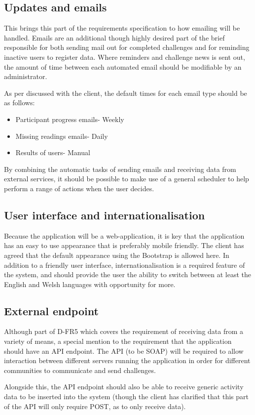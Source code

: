 \subsection{Updates and emails}
This brings this part of the requirements specification to how emailing will be handled. Emails are an additional though highly desired part of the brief responsible for both sending mail out for completed challenges and for reminding inactive users to register data. Where reminders and challenge news is sent out, the amount of time between each automated email should be modifiable by an administrator. \par
As per discussed with the client, the default times for each email type should be as follows:
\begin{itemize}
\item Participant progress emails- Weekly
\item Missing readings emails- Daily
\item Results of users- Manual
\end{itemize}
By combining the automatic tasks of sending emails and receiving data from external services, it should be possible to make use of a general scheduler to help perform a range of actions when the user decides.
\subsection{User interface and internationalisation}
Because the application will be a web-application, it is key that the application has an easy to use appearance that is preferably mobile friendly. The client has agreed that the default appearance using the Bootstrap\cite{bootstrap} is allowed here. In addition to a friendly user interface, internationalisation is a required feature of the system, and should provide the user the ability to switch between at least the English and Welsh languages with opportunity for more.
\subsection{External endpoint}
Although part of D-FR5 which covers the requirement of receiving data from a variety of means, a special mention to the requirement that the application should have an API endpoint. The API (to be SOAP) will be required to allow interaction between different servers running the application in order for different communities to communicate and send challenges. \par
Alongside this, the API endpoint should also be able to receive generic activity data to be inserted into the system (though the client has clarified that this part of the API will only require POST, as to only receive data).
